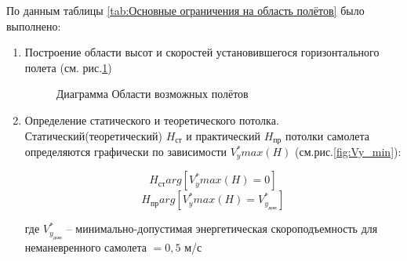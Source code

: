 По данным таблицы \ref{tab:Основные ограничения на область полётов} было выполнено:
\begin{enumerate}
    \item Построение области высот и скоростей установившегося горизонтального
полета (см. рис.\ref{fig:Область})

\begin{figure}[H]
    \caption{Диаграмма Области возможных полётов}
    \label{fig:Область}
\end{figure}

\item Определение статического и теоретического потолка. Статический(теоретический) $H_\text{ст}$ и практический $H_\text{пр}$ потолки самолета
определяются графически по зависимости $V_y^*max(H)$ (см.рис.\ref{fig:Vy_min}):

$$H_\text{ст}  arg[V_y^*max(H) = 0]$$
$$H_\text{пр}  arg[V_y^*max(H) = V_{y_\text{доп}}^*]$$

где $V_{y_\text{доп}}^*$ – минимально-допустимая энергетическая скороподъемность для
неманевренного самолета $= 0,5$ м/с


\end{enumerate}
